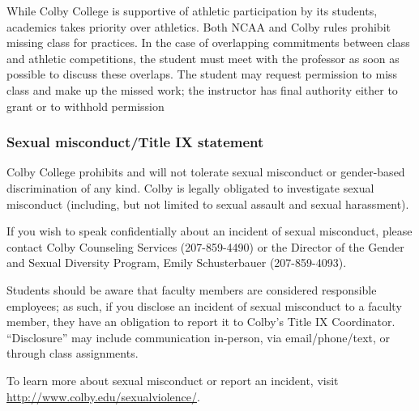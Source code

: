 \documentclass[]{article}
\begin{document}
While Colby College is supportive of athletic participation by its
students, academics takes priority over athletics. Both NCAA and Colby
rules prohibit missing class for practices. In the case of overlapping
commitments between class and athletic competitions, the student must
meet with the professor as soon as possible to discuss these overlaps.
The student may request permission to miss class and make up the missed
work; the instructor has final authority either to grant or to withhold
permission

\subsubsection{Sexual misconduct/Title IX statement
}\label{sexual-misconducttitle-ix-statement}

Colby College prohibits and will not tolerate sexual misconduct or
gender-based discrimination of any kind. Colby is legally obligated to
investigate sexual misconduct (including, but not limited to sexual
assault and sexual harassment).

If you wish to speak confidentially about an incident of sexual
misconduct, please contact Colby Counseling Services (207-859-4490) or
the Director of the Gender and Sexual Diversity Program, Emily
Schusterbauer (207-859-4093).

Students should be aware that faculty members are considered responsible
employees; as such, if you disclose an incident of sexual misconduct to
a faculty member, they have an obligation to report it to Colby's Title
IX Coordinator. ``Disclosure'' may include communication in-person, via
email/phone/text, or through class assignments.

To learn more about sexual misconduct or report an incident, visit
\url{http://www.colby.edu/sexualviolence/}.
%
\end{document}
